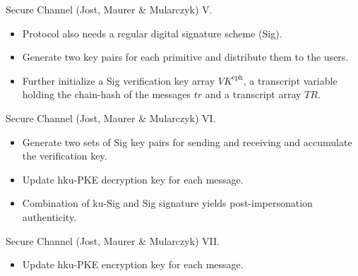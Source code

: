 \documentclass{beamer}
\renewcommand{\t}{\text}
\begin{document}
\begin{frame}{Secure Channel (Jost, Maurer \& Mularczyk) V.}
  \scriptsize
  \begin{figure}[ht]
     \centering
     \setlength{\fboxsep}{10pt}
     \scalebox{0.6}{%
       \fbox{%
         
       }
     }
  \end{figure}
  \begin{itemize}
  \item Protocol also needs a regular digital signature scheme (Sig).
  \item Generate two key pairs for each primitive and distribute them to the users.
  \item Further initialize a Sig verification key array $VK^\t{eph}$, a transcript
    variable holding the chain-hash of the messages $tr$ and a transcript array $TR$.
  \end{itemize}
\end{frame}

\begin{frame}{Secure Channel (Jost, Maurer \& Mularczyk) VI.}
  \scriptsize
  \begin{figure}[ht]
     \centering
     \setlength{\fboxsep}{10pt}
     \scalebox{0.6}{%
       \fbox{%
         
       }
     }
  \end{figure}
  \begin{itemize}
  \item Generate two sets of Sig key pairs for sending and receiving and
    accumulate the verification key.
  \item Update hku-PKE decryption key for each message.
  \item Combination of ku-Sig and Sig signature yields post-impersonation
    authenticity.
  \end{itemize}
\end{frame}

\begin{frame}{Secure Channel (Jost, Maurer \& Mularczyk) VII.}
  \scriptsize
  \begin{figure}[ht]
     \centering
     \setlength{\fboxsep}{10pt}
     \scalebox{0.55}{%
       \fbox{%
         
       }
     }
  \end{figure}
  \begin{itemize}
  \item Update hku-PKE encryption key for each message.
  \end{itemize}
\end{frame}
\end{document}
